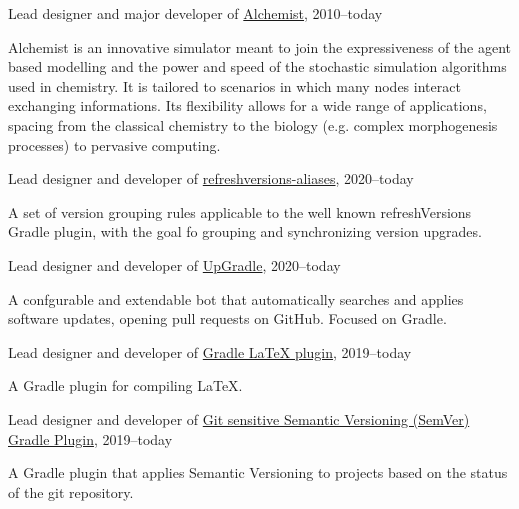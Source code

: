 \documentclass[10pt]{article}
\newenvironment{innerlist}[1][\enskip\textbullet]%
        {\begin{compactitem}[#1]}{\end{compactitem}}
\newcommand{\halfblankline}{\quad\vspace{-0.5\baselineskip}\pagebreak[3]}
\begin{document}
Lead designer and major developer of \href{http://alchemist.apice.unibo.it/}{Alchemist}, 2010--today
\begin{innerlist}
    \item Alchemist is an innovative simulator meant to join the expressiveness of the agent based modelling and the power and speed of the stochastic simulation algorithms used in chemistry. It is tailored to scenarios in which many nodes interact exchanging  informations. Its flexibility allows for a wide range of applications, spacing from the classical chemistry to the biology (e.g. complex morphogenesis processes) to pervasive computing.
\end{innerlist}
\halfblankline

Lead designer and developer of \href{https://github.com/DanySK/refreshversions-aliases}{refreshversions-aliases}, 2020--today
\begin{innerlist}
    \item A set of version grouping rules applicable to the well known refreshVersions Gradle plugin,
    with the goal fo grouping and synchronizing version upgrades.
\end{innerlist}
\halfblankline

Lead designer and developer of \href{https://github.com/DanySK/upgradle}{UpGradle}, 2020--today
\begin{innerlist}
    \item A confgurable and extendable bot that automatically searches and applies software updates,
        opening pull requests on GitHub. Focused on Gradle.
\end{innerlist}
\halfblankline

Lead designer and developer of \href{https://github.com/DanySK/gradle-latex}{Gradle LaTeX plugin}, 2019--today
\begin{innerlist}
    \item A Gradle plugin for compiling LaTeX.
\end{innerlist}
\halfblankline

Lead designer and developer of \href{https://github.com/DanySK/git-sensitive-semantic-versioning-gradle-plugin}{Git sensitive Semantic Versioning (SemVer) Gradle Plugin}, 2019--today
\begin{innerlist}
    \item A Gradle plugin that applies Semantic Versioning to projects based on the status of the git repository.
\end{innerlist}
\halfblankline
\end{document}
